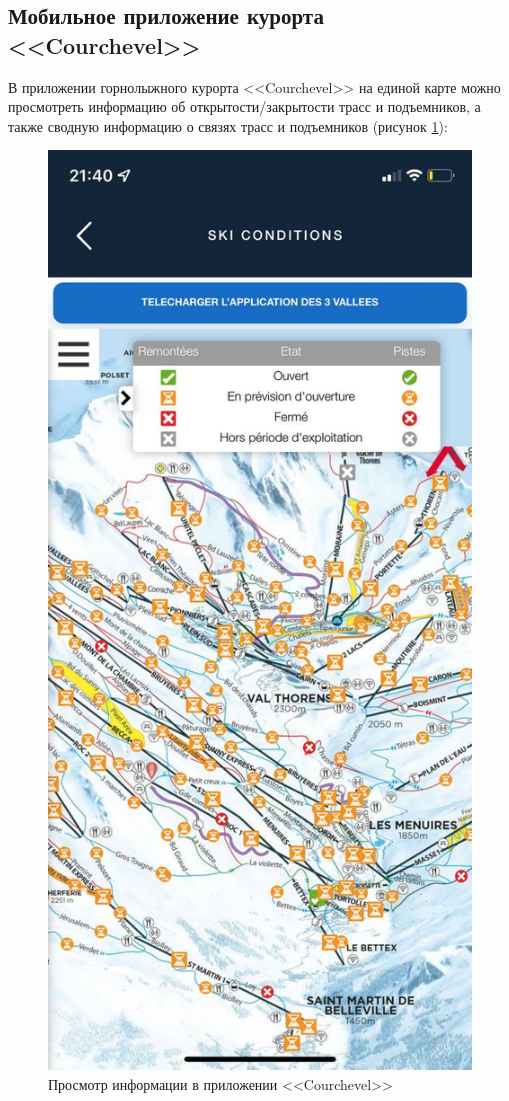 \clearpage
\subsection{Мобильное приложение курорта <<Courchevel>>}

В приложении горнолыжного курорта <<Courchevel>> на единой карте можно просмотреть информацию об открытости/закрытости трасс и подъемников, а также сводную информацию о связях трасс и подъемников (рисунок \ref{img:Courchevel}):


\begin{figure}[h!]
	\begin{center}
		\includegraphics[scale=0.35]{../imgs/analogue_apps/Courchevel.png}
	\end{center}
	\captionsetup{justification=centering}
	\caption{Просмотр информации в приложении <<Courchevel>>}
	\label{img:Courchevel}
\end{figure}


